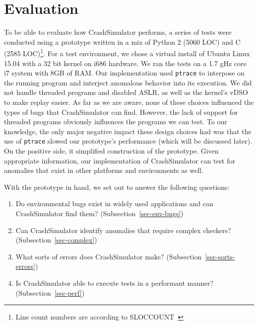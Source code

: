 \section{Evaluation}
\label{sec:evaluation}


To be able to evaluate how CrashSimulator performs, a series of tests were
conducted using a prototype written in a mix of 
Python 2 (5060 LOC) and C (2585 
LOC)\footnote{ Line count numbers are according to SLOCCOUNT~\cite{SLOCCOUNT}}.  
For a test
environment, we chose a virtual install of Ubuntu Linux 15.04 with a 32 bit 
kernel on i686 hardware.
We ran the tests on a 1.7 gHz core i7 system with 8GB of RAM. Our
implementation used {\tt ptrace} to interpose on the running program and
interject anomalous behavior into its execution.
We did not handle threaded programs and disabled ASLR, as well as the kernel's vDSO 
to make replay easier.  As far as we are aware, none of these choices 
influenced the types of bugs that CrashSimulator can find. However, the lack of support
for threaded programs obviously influences the programs we can test.  To our
knowledge, the 
only major negative impact these design choices had was that the use of {\tt ptrace} 
slowed our prototype's performance (which will be discussed later).
On the positive side, it simplified 
construction of the prototype. Given appropriate information, 
our implementation of CrashSimulator can
test for anomalies that exist in other platforms and environments as well.

With the prototype in hand,  we set out to answer the following questions:

\begin{enumerate}
   \item{Do environmental bugs exist in widely used
       applications and can CrashSimulator find them? (Subsection~\ref{sec-env-bugs})}
   \item{Can CrashSimulator identify anomalies that require
       complex checkers? (Subsection~\ref{sec-complex})}
   \item{What sorts of errors does CrashSimulator make? (Subsection~\ref{sec-sorts-errors})}
   \item{Is CrashSimulator able to execute tests in a performant manner? (Subsection~\ref{sec-perf})}
\end{enumerate}



